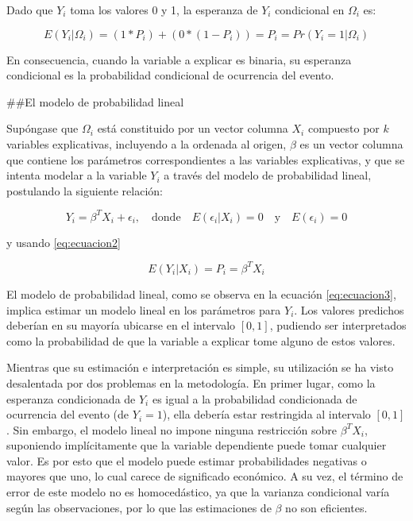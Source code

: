 \documentclass[
  12pt,
]{krantz}
\theoremstyle{definition}
\theoremstyle{definition}
\theoremstyle{definition}
\theoremstyle{remark}
\begin{document}
Dado que \(Y_i\) toma los valores 0 y 1, la esperanza de \(Y_i\) condicional en \(\Omega_i\) es:

\begin{equation}
E(Y_i|\Omega_i)=(1*P_i)+(0*(1-P_i))=P_i=Pr(Y_i=1|\Omega_i)
\label{eq:ecuacion2}
\end{equation}

En consecuencia, cuando la variable a explicar es binaria, su esperanza condicional es la probabilidad condicional de ocurrencia del evento.

\#\#El modelo de probabilidad lineal

Supóngase que \(\Omega_i\) está constituido por un vector columna \(X_i\) compuesto por \(k\) variables explicativas, incluyendo a la ordenada al origen, \(\beta\) es un vector columna que contiene los parámetros correspondientes a las variables explicativas, y que se intenta modelar a la variable \(Y_i\) a través del modelo de probabilidad lineal, postulando la siguiente relación:

\[Y_i=\beta^TX_i+\epsilon_i,\quad\textrm{donde}\quad E(\epsilon_i|X_i)=0\quad \textrm{y}\quad E(\epsilon_i)=0 
\label{eq:ecuacion3}\]

y usando \eqref{eq:ecuacion2}

\[E(Y_i|X_i)=P_i=\beta^TX_i
\label{eq:ecuacion4}\]

El modelo de probabilidad lineal, como se observa en la ecuación \eqref{eq:ecuacion3}, implica estimar un modelo lineal en los parámetros para \(Y_i\). Los valores predichos deberían en su mayoría ubicarse en el intervalo \([0,1]\), pudiendo ser interpretados como la probabilidad de que la variable a explicar tome alguno de estos valores.

Mientras que su estimación e interpretación es simple, su utilización se ha visto desalentada por dos problemas en la metodología. En primer lugar, como la esperanza condicionada de \(Y_i\) es igual a la probabilidad condicionada de ocurrencia del evento (de \(Y_i=1\)), ella debería estar restringida al intervalo \([0,1]\). Sin embargo, el modelo lineal no impone ninguna restricción sobre \(\beta^TX_i\), suponiendo implícitamente que la variable dependiente puede tomar cualquier valor. Es por esto que el modelo puede estimar probabilidades negativas o mayores que uno, lo cual carece de significado económico. A su vez, el término de error de este modelo no es homocedástico, ya que la varianza condicional varía según las observaciones, por lo que las estimaciones de \(\beta\) no son eficientes.
\end{document}
